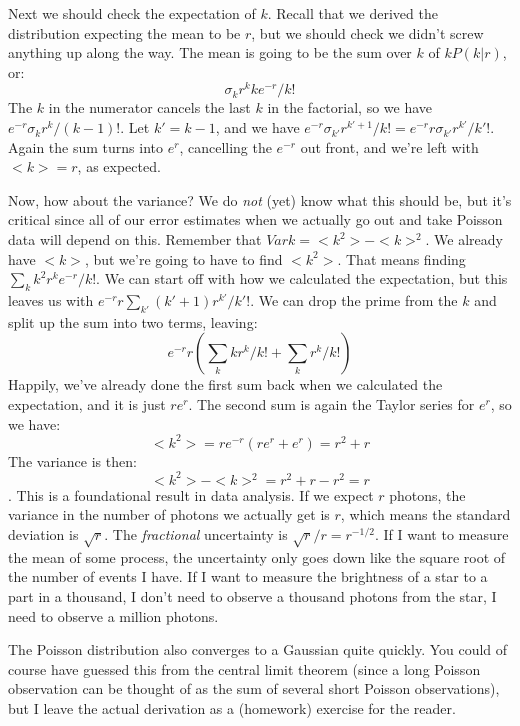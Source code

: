 \documentclass[letterpaper,11pt,preprint]{aastex}
\begin{document}
Next we should check the expectation of $k$.  Recall that we derived
the distribution expecting the mean to be $r$, but we should check we
didn't screw anything up along the way.  The mean is going to be the
sum over $k$ of $kP(k|r)$, or:
$$\sigma_k r^k k e^{-r}/k!$$
The $k$ in the numerator cancels the last $k$ in the factorial, so we
have $e^{-r}\sigma_k r^k/(k-1)!$.  Let $k'=k-1$, and we
have $e^{-r}\sigma_{k'} r^{k'+1}/k! = e^{-r}r\sigma_{k'}r^{k'}/k'!$.
Again the sum turns into $e^r$, cancelling the $e^{-r}$ out front, and
we're left with $<k>=r$, as expected.

Now, how about the variance?  We do {\textit{not}} (yet) know what
this should be, but it's critical since all of our error estimates
when we actually go out and take Poisson data will depend on this.
Remember that $Var{k}=<k^2>-<k>^2$.  We already have $<k>$, but we're
going to have to find $<k^2>$.  That means finding $\sum_k
k^2r^ke^{-r}/k!$.  We can start off with how we calculated the
expectation, but this leaves us with $e^{-r}r \sum_{k'}
(k'+1)r^{k'}/k'!$.  
We can drop the prime from the $k$ and split up the sum into two
terms, leaving:
$$e^{-r}r\left (\sum_k kr^k/k! + \sum_k r^k/k! \right )$$
Happily, we've already done the first sum back when we calculated the
expectation, and it is just $re^r$.  The second sum is again the
Taylor series for $e^r$, so we have:
$$<k^2>=re^{-r}(re^r+e^r) = r^2+r$$
The variance is then:
$$<k^2>-<k>^2=r^2+r-r^2=r$$.
This is a foundational result in data analysis.  If we expect $r$
photons, the variance in the number of photons we actually get is $r$,
which means the standard deviation is $\sqrt{r}$.  The
{\textit{fractional}} uncertainty is $\sqrt{r}/r=r^{-1/2}$.  If I want
to measure the mean of some process, the uncertainty only goes down
like the square root of the number of events I have.  If I want to
measure the brightness of a star to a part in a thousand, I don't need to
observe a thousand photons from the star, I need to observe a million
photons.

The Poisson distribution also converges to a Gaussian quite quickly.
You could of course have guessed this from the central limit theorem
(since a long Poisson observation can be thought of as the sum of
several short Poisson observations), but I leave the actual derivation
as a (homework) exercise for the reader.
\end{document}
